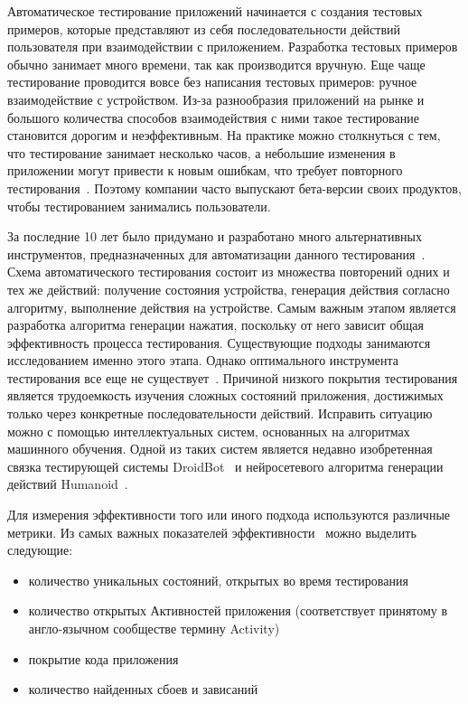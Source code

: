 Автоматическое тестирование приложений начинается с создания тестовых примеров, которые представляют из себя последовательности действий пользователя при взаимодействии с приложением. Разработка тестовых примеров обычно занимает много времени, так как производится вручную. Еще чаще тестирование проводится вовсе без написания тестовых примеров: ручное взаимодействие с устройством. Из-за разнообразия приложений на рынке и большого количества способов взаимодействия с ними такое тестирование становится дорогим и неэффективным. На практике можно столкнуться с тем, что тестирование занимает несколько часов, а небольшие изменения в приложении могут привести к новым ошибкам, что требует повторного тестирования~\cite{arnatovich2018systematic}. Поэтому компании часто выпускают бета-версии своих продуктов, чтобы тестированием занимались пользователи. 

За последние 10 лет было придумано и разработано много альтернативных инструментов, предназначенных для автоматизации данного тестирования~\cite{haoyin2017automatic, machiry2013dynodroid, studio2017ui, li2019deep, azim2013targeted, hao2014puma, mao2016sapienz}. Схема автоматического тестирования состоит из множества повторений одних и тех же действий: получение состояния устройства, генерация действия согласно алгоритму, выполнение действия на устройстве. Самым важным этапом является разработка алгоритма генерации нажатия, поскольку от него зависит общая эффективность процесса тестирования. Существующие подходы занимаются исследованием именно этого этапа. Однако оптимального инструмента тестирования все еще не существует~\cite{choudhary2015automated}. Причиной низкого покрытия тестирования является трудоемкость изучения сложных состояний приложения, достижимых только через конкретные последовательности действий. Исправить ситуацию можно с помощью интеллектуальных систем, основанных на алгоритмах машинного обучения. Одной из таких систем является недавно изобретенная связка тестирующей системы DroidBot~\cite{li2017droidbot} и нейросетевого алгоритма генерации действий Humanoid~\cite{li2019deep}.

Для измерения эффективности того или иного подхода используются различные метрики. Из самых важных показателей эффективности~\cite{memon2001coverage} можно выделить следующие:

\begin{itemize}

\item количество уникальных состояний, открытых во время тестирования

\item количество открытых Активностей приложения (соответствует принятому в англо-язычном сообществе термину Activity)

\item покрытие кода приложения

\item количество найденных сбоев и зависаний

\end{itemize}

